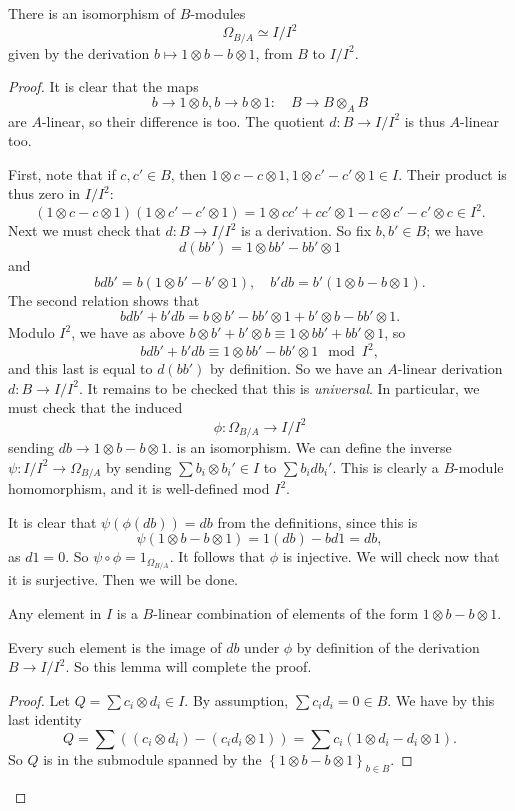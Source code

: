 \begin{proposition} \label{alternateOmega}
There is an isomorphism of $B$-modules
\[ \Omega_{B/A} \simeq I/I^2  \]
given by the derivation $b \mapsto 1 \otimes b - b \otimes 1$, from $B$ to
$I/I^2$.
\end{proposition} 
\begin{proof}
It is clear that the maps
\[ b \to 1 \otimes b, b \to b \otimes 1: \quad B \to B \otimes_A B   \]
are $A$-linear, so their difference is too. The quotient $d:B \to I/I^2$ is thus
$A$-linear too. 

First, note that if $c,c' \in B$, then $1 \otimes c - c \otimes 1, 1 \otimes c'
- c' \otimes 1 \in I$. Their product is thus zero in $I/I^2$:
\[  (1 \otimes c - c \otimes 1)(1 \otimes c'
- c' \otimes 1) = 1 \otimes cc' + cc' \otimes 1  - c \otimes c' - c' \otimes c
  \in I^2.\]
Next
we must check that $d: B \to I/I^2$ is a derivation. So fix $b, b' \in B$; we
have
\[ d(bb') =   1 \otimes bb'- bb' \otimes 1\]
and
\[ bdb' = b (   1 \otimes b'-b' \otimes 1), \quad b' db = b'(1
\otimes b - b \otimes 1  ).  \]
The second relation shows that
\[ bdb' + b' db =   b \otimes b' -  bb' \otimes 1+ b' \otimes b - bb' \otimes
1 . \]
Modulo $I^2$, we have as above $b \otimes b' + b' \otimes b \equiv 1 \otimes
bb' + bb' \otimes 1$, so 
\[   bdb' + b' db \equiv 1 \otimes bb' - bb' \otimes 1 \mod I^2,  \]
and this last is equal to $d(bb')$ by definition. So we have an $A$-linear
derivation $d: B \to I/I^2$. It remains to be checked that this is
\emph{universal}. In particular, we must check that the induced
\[ \phi: \Omega_{B/A} \to I/I^2  \]
sending $db \to 1 \otimes b - b \otimes 1$.
is an isomorphism. We can define the inverse $\psi: I/I^2 \to \Omega_{B/A}$ by sending $\sum b_i \otimes b_i'
\in I$
to $\sum b_i db_i'$. This is clearly a $B$-module homomorphism, and it
 is well-defined mod $I^2$.

It is clear that $\psi (\phi(db)) = db$ from the definitions, since this
is
\[ \psi( 1 \otimes b - b \otimes 1) = 1 (db) - b d1 = db,  \]
as $d1 = 0$. So $\psi \circ \phi = 1_{\Omega_{B/A}}$. 
It follows that $\phi$ is injective. 
We will check now that it is surjective.
Then we will be done.

\begin{lemma} 
Any element in $I$ is a $B$-linear combination of elements of the form $1
\otimes b - b \otimes 1$.
\end{lemma} 

Every such element is the image of $db$ under $\phi$ by definition of the
derivation $B \to I/I^2$. So this lemma will complete the proof.

\begin{proof} 
Let $Q = \sum c_i \otimes d_i \in I$. By assumption, $\sum c_i d_i = 0 \in B$.
We have by this last identity
\[Q =  \sum \left( ( c_i \otimes d_i ) - (c_i d_i \otimes 1)\right)
= \sum c_i (1 \otimes d_i - d_i \otimes 1).
\]
So $Q$ is in the submodule spanned by the $\left\{1 \otimes b - b \otimes
1\right\}_{b \in B}$.
\end{proof} 
\end{proof}

